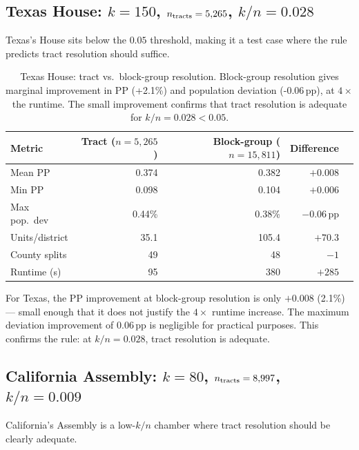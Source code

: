 \subsection{Texas House: $k=150$, $n_{\rm tracts}=5{,}265$, $k/n = 0.028$}
\label{sec:comparison:tx}

Texas's House sits below the $0.05$ threshold, making it a test case where
the rule predicts tract resolution should suffice.

\begin{table}[h]
\centering\small
\begin{tabular}{lrrrr}
\toprule
Metric & Tract ($n=5{,}265$) & Block-group ($n=15{,}811$) & Difference \\
\midrule
Mean PP       & 0.374 & 0.382 & $+0.008$ \\
Min PP        & 0.098 & 0.104 & $+0.006$ \\
Max pop.\ dev & 0.44\% & 0.38\% & $-0.06$\,pp \\
Units/district & 35.1 & 105.4 & $+70.3$ \\
County splits & 49 & 48 & $-1$ \\
Runtime (s)   & 95 & 380 & $+285$ \\
\bottomrule
\end{tabular}
\caption{Texas House: tract vs.\ block-group resolution. Block-group resolution
  gives marginal improvement in PP (+2.1\%) and population deviation (-0.06\,pp),
  at $4\times$ the runtime. The small improvement confirms that tract resolution
  is adequate for $k/n = 0.028 < 0.05$.}
\label{tab:tx-comparison}
\end{table}

For Texas, the PP improvement at block-group resolution is only $+0.008$ (2.1\%)---
small enough that it does not justify the $4\times$ runtime increase.
The maximum deviation improvement of $0.06$\,pp is negligible for practical purposes.
This confirms the rule: at $k/n = 0.028$, tract resolution is adequate.

\subsection{California Assembly: $k=80$, $n_{\rm tracts}=8{,}997$, $k/n = 0.009$}
\label{sec:comparison:ca}

California's Assembly is a low-$k/n$ chamber where tract resolution should
be clearly adequate.

